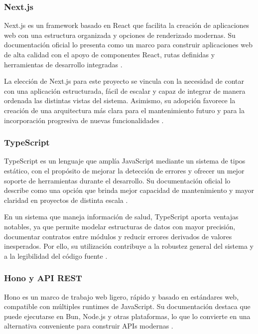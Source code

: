\subsubsection{Next.js}

Next.js es un framework basado en React que facilita la creación de aplicaciones web con una estructura organizada y opciones de renderizado modernas. Su documentación oficial lo presenta como un marco para construir aplicaciones web de alta calidad con el apoyo de componentes React, rutas definidas y herramientas de desarrollo integradas \cite{nextjs2025docs,nextjs2025release}.

La elección de Next.js para este proyecto se vincula con la necesidad de contar con una aplicación estructurada, fácil de escalar y capaz de integrar de manera ordenada las distintas vistas del sistema. Asimismo, su adopción favorece la creación de una arquitectura más clara para el mantenimiento futuro y para la incorporación progresiva de nuevas funcionalidades \cite{nextjs2025docs}.

\subsubsection{TypeScript}

TypeScript es un lenguaje que amplía JavaScript mediante un sistema de tipos estático, con el propósito de mejorar la detección de errores y ofrecer un mejor soporte de herramientas durante el desarrollo. Su documentación oficial lo describe como una opción que brinda mejor capacidad de mantenimiento y mayor claridad en proyectos de distinta escala \cite{typescript2025docs}.

En un sistema que maneja información de salud, TypeScript aporta ventajas notables, ya que permite modelar estructuras de datos con mayor precisión, documentar contratos entre módulos y reducir errores derivados de valores inesperados. Por ello, su utilización contribuye a la robustez general del sistema y a la legibilidad del código fuente \cite{typescript2025docs}.

\subsubsection{Hono y API REST}

Hono es un marco de trabajo web ligero, rápido y basado en estándares web, compatible con múltiples runtimes de JavaScript. Su documentación destaca que puede ejecutarse en Bun, Node.js y otras plataformas, lo que lo convierte en una alternativa conveniente para construir APIs modernas \cite{hono2025docs,hono2025bun}.

